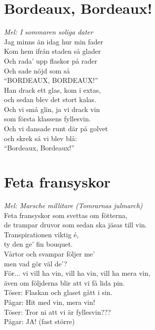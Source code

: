 \documentclass[twoside, openright]{report}
\begin{document}
\section{Bordeaux, Bordeaux!}
\textit{Mel: I sommaren soliga dater}\\

Jag minns än idag hur min fader\\
Kom hem ifrån staden så glader\\
Och rada’ upp flaskor på rader\\
Och sade nöjd som så\\
``BORDEAUX, BORDEAUX!''\\

Han drack ett glas, kom i extas,\\
och sedan blev det stort kalas.\\
Och vi små glin, ja vi drack vin\\
som första klassens fyllesvin.\\
Och vi dansade runt där på golvet\\
och skrek så vi blev blå:\\
``Bordeaux, Bordeaux!''\\

\section{Feta fransyskor}
\textit{Mel: Marsche millitare (Tomrarnas julmarch)}\\

Feta fransyskor som svettas om fötterna,\\
de trampar druvor som sedan ska jäsas till vin.\\
Transpirationen viktig é,\\
ty den ge' fin bouquet.\\
Vårtor och svampar följer me’\\
men vad gör väl de’?\\

För... vi vill ha vin, vill ha vin, vill ha mera vin,\\
även om följderna blir att vi få lida pin.\\
Töser: Flaskan och glaset gått i sin.\\
Pågar: Hit med vin, mera vin!\\
Töser: Tror ni att vi är fyllesvin???\\
Pågar: JA! (fast större)\\
\end{document}

